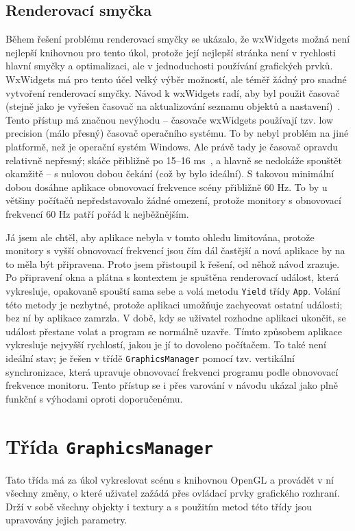 \documentclass[a4paper, 11pt]{report}
\begin{document}
\subsection{Renderovací smyčka}
Během řešení problému renderovací smyčky se ukázalo, že wxWidgets možná není nejlepší knihovnou pro tento úkol, protože její nejlepší stránka není v rychlosti hlavní smyčky a optimalizaci, ale v jednoduchosti používání grafických prvků. WxWidgets má pro tento účel velký výběr možností, ale téměř žádný pro snadné vytvoření renderovací smyčky. Návod k wxWidgets radí, aby byl použit časovač (stejně jako je vyřešen časovač na aktualizování seznamu objektů a nastavení)~\cite{wx:render}. Tento přístup má značnou nevýhodu -- časovače wxWidgets používají tzv. low precision (málo přesný) časovač operačního systému. To by nebyl problém na jiné platformě, než je operační systém Windows. Ale právě tady je časovač opravdu relativně nepřesný; skáče přibližně po 15--16 ms~\cite{ms:timer}, a hlavně se nedokáže spouštět okamžitě -- s nulovou dobou čekání (což by bylo ideální). S takovou minimální dobou dosáhne aplikace obnovovací frekvence scény přibližně 60 Hz. To by u většiny počítačů nepředstavovalo žádné omezení, protože monitory s obnovovací frekvencí 60 Hz patří pořád k nejběžnějším.

Já jsem ale chtěl, aby aplikace nebyla v tomto ohledu limitována, protože monitory s vyšší obnovovací frekvencí jsou čím dál častější a nová aplikace by na to měla být připravena. Proto jsem přistoupil k řešení, od něhož návod zrazuje. Po připravení okna a plátna s kontextem je spuštěna renderovací událost, která vykresluje, opakovaně spouští sama sebe a volá metodu \texttt{Yield} třídy \texttt{App}. Volání této metody je nezbytné, protože aplikaci umožňuje zachycovat ostatní události; bez ní by aplikace zamrzla. V době, kdy se uživatel rozhodne aplikaci ukončit, se událost přestane volat a program se normálně uzavře. Tímto způsobem aplikace vykresluje nejvyšší rychlostí, jakou je jí to dovoleno počítačem. To také není ideální stav; je řešen v třídě \texttt{GraphicsManager} pomocí tzv. vertikální synchronizace, která upravuje obnovovací frekvenci programu podle obnovovací frekvence monitoru. Tento přístup se i přes varování v návodu ukázal jako plně funkční s výhodami oproti doporučenému.

\section{Třída \texttt{GraphicsManager}}
Tato třída má za úkol vykreslovat scénu s knihovnou OpenGL a provádět v ní všechny změny, o které uživatel zažádá přes ovládací prvky grafického rozhraní. Drží v sobě všechny objekty i textury a s použitím metod této třídy jsou upravovány jejich parametry.
\end{document}

